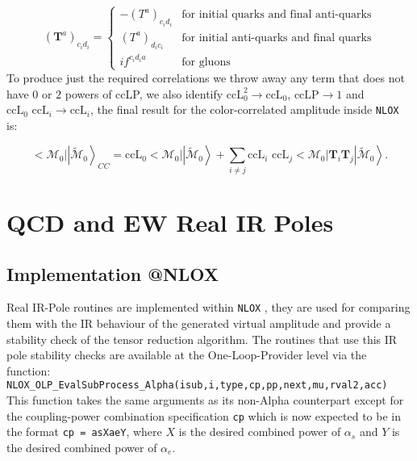 \documentclass[a4paper]{article}
\def \NLOX{\texttt{NLOX} }
\begin{document}
  \[ 
  (\textbf{T}^a)_{c_id_i} =
  \begin{cases} 
      -(T^a)_{c_id_i} & \text{for initial quarks and final anti-quarks} \\
      (T^a)_{d_ic_i} & \text{for initial anti-quarks and final quarks} \\
      if^{c_id_ia} & \text{for gluons} 
   \end{cases}
  \]
To produce just the required correlations we throw away any term that does not have $0$ or
$2$ powers of ccLP, we also identify $\text{ccL}_0^2\rightarrow \text{ccL}_0$, $\text{ccLP}\rightarrow 1$ and 
$\text{ccL}_0\text{ ccL}_i\rightarrow \text{ccL}_i$, the final result for the color-correlated amplitude inside \NLOX is:

\begin{equation}
  \Big<\mathcal{M}_0\Big|\left|\mathcal{\tilde M}_0\right>_{CC} = 
 \text{ccL}_0 \Big<\mathcal{M}_0\Big|\left|\mathcal{\tilde M}_0\right> +  
 \sum_{i \neq j} \text{ccL}_i\text{ ccL}_j 
 \Big<\mathcal{M}_0\Big|\textbf{T}_i\textbf{T}_j\left|\mathcal{\tilde M}_0\right>.
\end{equation}

\newpage
\section{QCD and EW Real IR Poles}
\subsection{Implementation @NLOX}

Real IR-Pole routines are implemented within \NLOX, they are used 
for comparing them with the IR behaviour of the generated virtual 
amplitude and provide a stability check of the tensor reduction algorithm. 
The routines that use this IR pole stability checks are available at the 
One-Loop-Provider level via the function:\\

\texttt{NLOX\_OLP\_EvalSubProcess\_Alpha(isub,i,type,cp,pp,next,mu,rval2,acc)}\\

This function takes the same arguments as its non-Alpha counterpart except for the coupling-power
combination specification \texttt{cp} which is now expected to be in the format \texttt{cp = asXaeY},
where $X$ is the desired combined power of $\alpha_s$ and $Y$ is the desired combined power of $\alpha_e$.\\
\end{document}
